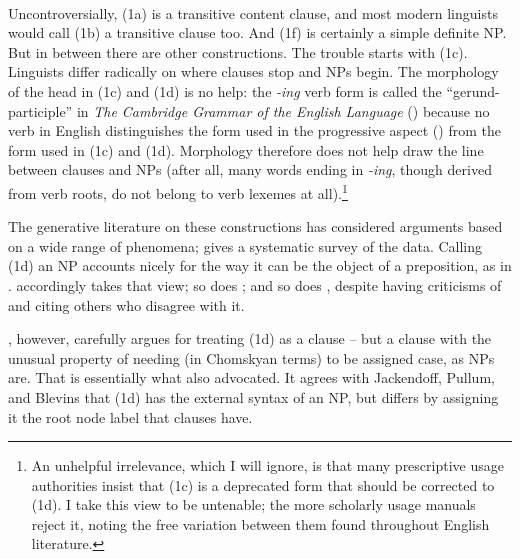 \documentclass[output=paper,colorlinks,citecolor=brown
]{langscibook}
\begin{document}
\ea \ea {} \\
    \ex {}  \\
    \ex {} \\
    \ex {} \\
    \ex {} \\
    \ex {} \\
    \z
\z
\noindent
Uncontroversially, (1a) is a transitive content clause, and most
modern linguists would call (1b) a transitive clause too.
And (1f) is certainly a simple definite NP. But in between there are
other constructions. The trouble starts with (1c). Linguists differ
radically on where clauses stop and NPs begin.
The morphology of the head in (1c) and (1d) is no help:
the \textit{-ing} verb form is called the ``gerund-participle'' in
\textit{The Cambridge Grammar of the English Language}
(\citealt{HuddPull02}) because no verb in English distinguishes the form
used in the progressive aspect () from the form used
in (1c) and (1d). Morphology therefore does not help draw the line
between clauses and NPs (after all, many words ending in
\mbox{\itshape-ing}, though derived from verb roots, do not belong
to verb lexemes at all).\footnote{\label{gerundsubject}%
   An unhelpful irrelevance, which I will ignore, is that many
   prescriptive usage authorities insist that (1c) is a deprecated
   form that should be corrected to (1d). I take this view to be
   untenable; the more scholarly usage manuals reject it, noting the
   free variation between them found throughout English literature.}

The generative literature on these constructions has considered
arguments based on a wide range of phenomena; \citet{Pullum91}
gives a systematic survey of the data. Calling (1d) an NP accounts
nicely for the way it can be the object of a preposition, as in
. \citet[222--223]{Jackendoff77} accordingly takes that view; so
does \citet{Pullum91}; and so does \citet{Blevins05}, despite having
criticisms of \citet{Pullum91} and citing others who disagree with it.

\citet{Kiparsky17}, however, carefully argues for treating (1d) as
a clause -- but a clause with the unusual property of needing (in
Chomskyan terms) to be assigned case, as NPs are. That is essentially
what \citet{Stowell81} also advocated. It agrees with Jackendoff,
Pullum, and Blevins that (1d) has the external syntax of an NP, but
differs by assigning it the root node label that clauses have.
\end{document}
